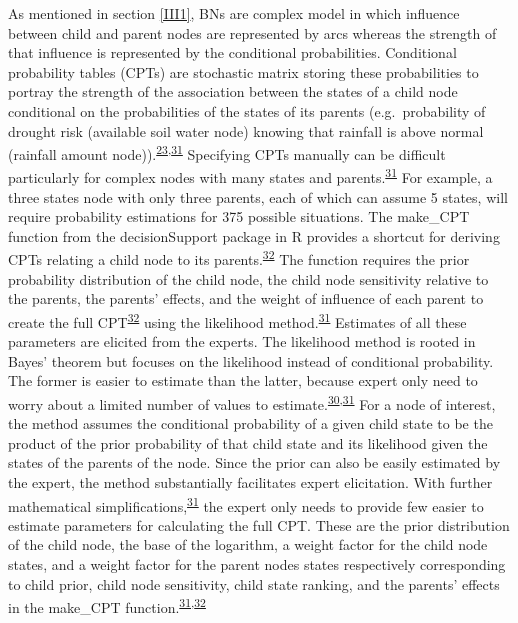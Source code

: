 \documentclass[12pt,oneside]{article}
\begin{document}
As mentioned in section \ref{III1}, BNs are complex model in which influence between child and parent nodes are represented by arcs whereas the strength of that influence is represented by the conditional probabilities. Conditional probability tables (CPTs) are stochastic matrix storing these probabilities to portray the strength of the association between the states of a child node conditional on the probabilities of the states of its parents (e.g.~probability of drought risk (available soil water node) knowing that rainfall is above normal (rainfall amount node)).\textsuperscript{\protect\hyperlink{ref-Scutari_and_Denis_2015}{23},\protect\hyperlink{ref-Hansson_and_Sjokvist_2013}{31}} Specifying CPTs manually can be difficult particularly for complex nodes with many states and parents.\textsuperscript{\protect\hyperlink{ref-Hansson_and_Sjokvist_2013}{31}} For example, a three states node with only three parents, each of which can assume 5 states, will require probability estimations for 375 possible situations. The make\_CPT function from the decisionSupport package in R provides a shortcut for deriving CPTs relating a child node to its parents.\textsuperscript{\protect\hyperlink{ref-Luedeling_and_Goehring_2018}{32}} The function requires the prior probability distribution of the child node, the child node sensitivity relative to the parents, the parents' effects, and the weight of influence of each parent to create the full CPT\textsuperscript{\protect\hyperlink{ref-Luedeling_and_Goehring_2018}{32}} using the likelihood method.\textsuperscript{\protect\hyperlink{ref-Hansson_and_Sjokvist_2013}{31}} Estimates of all these parameters are elicited from the experts. The likelihood method is rooted in Bayes' theorem but focuses on the likelihood instead of conditional probability. The former is easier to estimate than the latter, because expert only need to worry about a limited number of values to estimate.\textsuperscript{\protect\hyperlink{ref-Whitney_et_al_2018a}{30},\protect\hyperlink{ref-Hansson_and_Sjokvist_2013}{31}} For a node of interest, the method assumes the conditional probability of a given child state to be the product of the prior probability of that child state and its likelihood given the states of the parents of the node. Since the prior can also be easily estimated by the expert, the method substantially facilitates expert elicitation. With further mathematical simplifications,\textsuperscript{\protect\hyperlink{ref-Hansson_and_Sjokvist_2013}{31}} the expert only needs to provide few easier to estimate parameters for calculating the full CPT. These are the prior distribution of the child node, the base of the logarithm, a weight factor for the child node states, and a weight factor for the parent nodes states respectively corresponding to child prior, child node sensitivity, child state ranking, and the parents' effects in the make\_CPT function.\textsuperscript{\protect\hyperlink{ref-Hansson_and_Sjokvist_2013}{31},\protect\hyperlink{ref-Luedeling_and_Goehring_2018}{32}}
\end{document}
